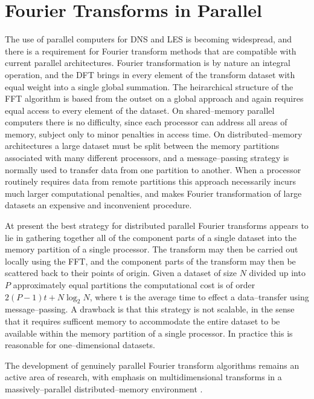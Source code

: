 \documentclass[dvips]{article}
\begin{document}
\section*{Fourier Transforms in Parallel}
The use of parallel computers for DNS and LES is becoming widespread,
and there is a requirement for Fourier transform methods that are
compatible with current parallel architectures.  Fourier transformation
is by nature an integral operation, and the DFT brings in every element of the
transform dataset with equal weight into a single global summation.
The heirarchical structure of the FFT algorithm is based from the outset
on a global
approach and again requires equal access to every element of the dataset.
On shared--memory parallel computers there is no difficulty, since each
processor can address all areas of memory, subject only to minor penalties
in access time.  On distributed--memory
architectures a large dataset must be split between the memory
partitions associated with many different processors, and a
message--passing strategy is normally used to transfer data from one
partition to another.  When a processor routinely requires data from
remote partitions this
approach necessarily incurs much larger computational penalties, and
makes Fourier transformation of large datasets an expensive and
inconvenient procedure.

At present the best strategy for distributed parallel Fourier transforms
appears to lie in gathering together all of the component parts of a
single dataset into the memory partition of a single processor.
The transform may then be carried out locally using the FFT, and the
component parts of the transform may then be scattered back to their points
of origin.  Given a dataset of size $N$ divided up into $P$
approximately equal partitions
the computational cost is of order $2(P-1)t+N\log_{2}{N}$, where t is the
average time to effect a data--transfer using message--passing.  A
drawback is that this
strategy is not scalable, in the sense that it requires sufficent memory
to accommodate the entire dataset to be available within the memory partition
of a single processor.  In practice this is reasonable for one--dimensional
datasets.

The development of genuinely parallel Fourier transform algorithms
remains an active
area of research, with emphasis on multidimensional transforms in a
massively--parallel distributed--memory environment \cite {allan}.
\end{document}
